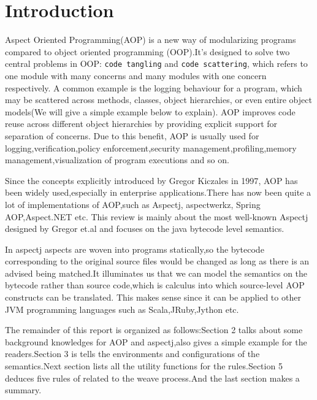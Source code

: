\section{Introduction}
Aspect Oriented Programming(AOP) is a new way of modularizing programs compared to object oriented programming
(OOP).It's designed to solve two central problems in OOP: \texttt{code tangling} and \texttt{code scattering}, which refers to one module with many concerns and many modules with one concern respectively. A common example is the logging behaviour for a program, which may be scattered across methods, classes, object hierarchies, or even entire object models(We will give a simple example below to explain). AOP improves code reuse across different object hierarchies by providing explicit support for separation of concerns. Due to this benefit, AOP is usually used for logging,verification,policy enforcement,security management,profiling,memory management,visualization of program executions and so on.

Since the concepts explicitly introduced by Gregor Kiczales in 1997\cite{web:aopwiki}, AOP has been widely used,especially in enterprise applications.There has now been quite a lot of implementations of AOP,such as Aspectj, aspectwerkz, Spring AOP,Aspect.NET etc. This review is mainly about the most well-known Aspectj designed by Gregor et.al and focuses on the java bytecode level semantics.

In aspectj aspects are woven into programs statically,so the bytecode corresponding to the original source files would be changed as long as there is an advised being matched.It illuminates us that we can model the semantics on the bytecode rather than source code,which is calculus into which source-level AOP constructs can be translated. This makes sense  since it can be applied to other JVM programming languages such as Scala,JRuby,Jython etc.

The remainder of this report is organized as follows:Section 2 talks about some background knowledges for AOP and aspectj,also gives a simple example for the readers.Section 3 is tells the environments and configurations of the semantics.Next section lists all the utility functions for the rules.Section 5 deduces five rules of related to the weave process.And the last section makes a summary.


